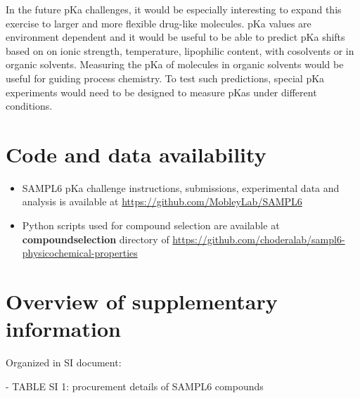 \documentclass[9pt,lineno]{elife}
\begin{document}
In the future pKa challenges, it would be especially interesting to expand this exercise to larger and more flexible drug-like molecules. 
pKa values are environment dependent and it would be useful to be able to predict pKa shifts based on on ionic strength, temperature, lipophilic content, with cosolvents or in organic solvents. 
Measuring the pKa of molecules in organic solvents would be useful for guiding process chemistry. 
To test such predictions, special pKa experiments would need to be designed to measure pKas under different conditions.

\section{Code and data availability}
\begin{minipage}{15cm}
\begin{itemize}

\item SAMPL6 pKa challenge instructions, submissions, experimental data and analysis is available at  \href{https://github.com/MobleyLab/SAMPL6}{https://github.com/MobleyLab/SAMPL6}

\item Python scripts used for compound selection are available at \textbf{compound\textunderscore selection} directory of  
\href{https://github.com/choderalab/sampl6\textendash physicochemical\textendash properties}{https://github.com/choderalab/sampl6-physicochemical-properties}

\end{itemize}
\end{minipage}



\section{Overview of supplementary information}

Organized in SI document:

- TABLE SI 1: procurement details of SAMPL6 compounds  
\end{document}
